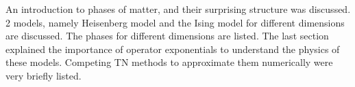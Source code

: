 An introduction to phases of matter, and their surprising structure was discussed. 2 models, namely Heisenberg model and the Ising model for different dimensions are discussed. The phases for different dimensions are listed. The last section explained the importance of operator exponentials to understand the physics of these models. Competing \Gls{TN} methods to approximate them numerically were very briefly listed.